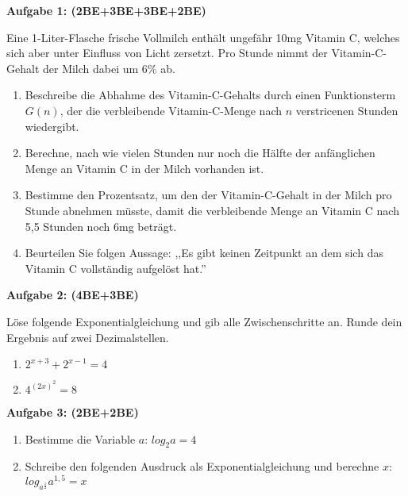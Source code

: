 \documentclass[a4paper,12pt]{article}
\newcommand{\Aufgabe}[1]{
  {
  \vspace*{0.5cm}
  \textsf{\textbf{Aufgabe #1}}
  \vspace*{0.2cm}
  
  }
}
\begin{document}

\Aufgabe{1: (2BE+3BE+3BE+2BE)}
Eine 1-Liter-Flasche frische Vollmilch enthält ungefähr 10mg Vitamin C, welches sich aber unter Einfluss von Licht zersetzt. Pro Stunde nimmt der Vitamin-C-Gehalt der Milch dabei um 6\% ab.\\

\begin{enumerate}[label={\alph*)}, topsep=5pt,itemsep=4ex,partopsep=1ex,parsep=1ex]
  \item Beschreibe die Abhahme des Vitamin-C-Gehalts durch einen Funktionsterm $G(n)$, der die verbleibende Vitamin-C-Menge nach $n$ verstricenen Stunden wiedergibt.  
  \item Berechne, nach wie vielen Stunden nur noch die Hälfte der anfänglichen Menge an Vitamin C in der Milch vorhanden ist.
  \item Bestimme den Prozentsatz, um den der Vitamin-C-Gehalt in der Milch pro Stunde abnehmen müsste, damit die verbleibende Menge an Vitamin C nach 5,5 Stunden noch 6mg beträgt.
  \item Beurteilen Sie folgen Aussage: ,,Es gibt keinen Zeitpunkt an dem sich das Vitamin C vollständig aufgelöst hat.''
\end{enumerate}

\Aufgabe{2: (4BE+3BE)}
Löse folgende Exponentialgleichung und gib alle Zwischenschritte an. Runde dein Ergebnis auf zwei Dezimalstellen.

\begin{enumerate}[label={\alph*)}, topsep=5pt,itemsep=4ex,partopsep=1ex,parsep=1ex]
  \item $2^{x+3} + 2^{x-1} = 4$

  \item $4^{(2x)^2} = 8$

\end{enumerate}

\Aufgabe{3: (2BE+2BE)}

\begin{enumerate}[label={\alph*)}, topsep=5pt,itemsep=4ex,partopsep=1ex,parsep=1ex]
  \item Bestimme die Variable $a$: $ log_2 a = 4 $
  \item Schreibe den folgenden Ausdruck als Exponentialgleichung und berechne $x$: $ log_{a^{\frac{1}{2}}} a^{1,5} = x $

\end{enumerate}
\end{document}
